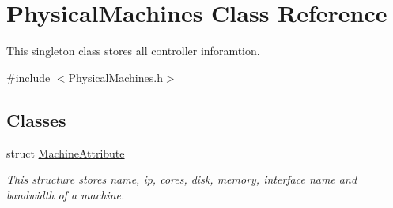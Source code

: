 \hypertarget{classPhysicalMachines}{\section{\-Physical\-Machines \-Class \-Reference}
\label{classPhysicalMachines}
}


\-This singleton class stores all controller inforamtion.  




{\ttfamily \#include $<$\-Physical\-Machines.\-h$>$}

\subsection*{\-Classes}
\begin{DoxyCompactItemize}
\item 
struct \hyperlink{structPhysicalMachines_1_1MachineAttribute}{\-Machine\-Attribute}
\begin{DoxyCompactList}\small\item\em \-This structure stores name, ip, cores, disk, memory, interface name and bandwidth of a machine. \end{DoxyCompactList}\end{DoxyCompactItemize}
